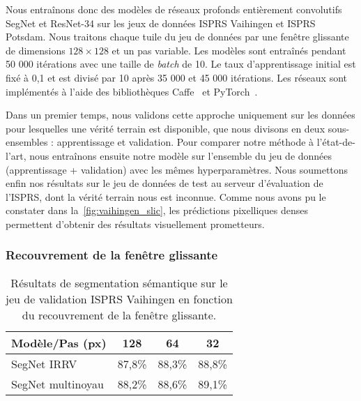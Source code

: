 Nous entraînons donc des modèles de réseaux profonds entièrement convolutifs SegNet et ResNet-34 sur les jeux de données \gls{ISPRS} Vaihingen et \gls{ISPRS} Potsdam.
Nous traitons chaque tuile du jeu de données par une fenêtre glissante de dimensions $128 \times 128$ et un pas variable. Les modèles sont entraînés pendant 50 000 itérations avec une taille de \emph{batch} de 10. Le taux d'apprentissage initial est fixé à 0,1 et est divisé par 10 après 35 000 et 45 000 itérations.
Les réseaux sont implémentés à l'aide des bibliothèques \gls{Caffe}~\cite{jia_caffe_2014} et \gls{PyTorch}~\cite{noauthor_pytorch_2016}.

Dans un premier temps, nous validons cette approche uniquement sur les données pour lesquelles une vérité terrain est disponible, que nous divisons en deux sous-ensembles : apprentissage et validation. Pour comparer notre méthode à l'état-de-l'art, nous entraînons ensuite notre modèle sur l'ensemble du jeu de données (apprentissage + validation) avec les mêmes hyperparamètres. Nous soumettons enfin nos résultats sur le jeu de données de test au serveur d'évaluation de l'\gls{ISPRS}, dont la vérité terrain nous est inconnue. Comme nous avons pu le constater dans la~\cref{fig:vaihingen_slic}, les prédictions pixelliques denses permettent d'obtenir des résultats visuellement prometteurs.

\subsubsection{Recouvrement de la fenêtre glissante}

\begin{table}[ht]
  \centering
  \caption{Résultats de segmentation sémantique sur le jeu de validation \gls{ISPRS} Vaihingen en fonction du recouvrement de la fenêtre glissante.}
  \setlength{\tabcolsep}{15pt}
  \begin{tabularx}{0.8\textwidth}{ Y c c c }
  \toprule
  Modèle/Pas (px) & 128 & 64 & 32\\
  \midrule
  SegNet \gls{IRRV} & 87,8\% & 88,3\% & 88,8\%\\
  SegNet multinoyau & 88,2\% & 88,6\% & 89,1\%\\
  \bottomrule
  \end{tabularx}
  \label{tab:vaihingen_stride}
\end{table}

